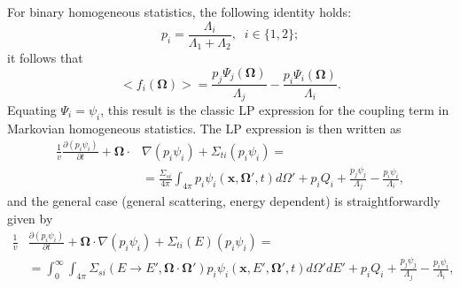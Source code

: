 \documentclass[12pt]{article}
\newcommand{\bl}{\big<}
\newcommand{\bg}{\big>}
\begin{document}
For binary homogeneous statistics, the following identity holds:
\begin{equation}\label{3.6}
p_i = \frac{\Lambda_i}{\Lambda_1+\Lambda_2},\;\; i\in\{1,2\};
\end{equation}
it follows that
\begin{equation}\label{3.7}
\bl f_i (\bm\Omega) \bg = \frac{p_j\Psi_j(\bm\Omega)}{\Lambda_j}
-\frac{p_i\Psi_i(\bm\Omega)}{\Lambda_i}.
\end{equation}
Equating $\Psi_i = \psi_i$, this result is the classic LP expression for the coupling term in Markovian homogeneous statistics.
The LP expression is then written as 
\begin{equation}%
\begin{split}
\frac{1}{v}\frac{\partial (p_i\psi_i)}{\partial t}+ \bm\Omega\cdot &\nabla(p_i\psi_i) + \Sigma_{ti}(p_i\psi_i) =
\\& =
 \frac{\Sigma_{si}}{4\pi}\int_{4\pi} p_i\psi_i(\bm x,\bm\Omega',t)d\Omega'+p_iQ_i +
 \frac{p_j\psi_j}{\Lambda_j} -  \frac{p_i\psi_i}{\Lambda_i},
\end{split}
\end{equation}
and the general case (general scattering, energy dependent) is straightforwardly given by
\begin{equation}\label{eq_averaged_closed}
\begin{split}
\frac{1}{v}&\frac{\partial (p_i\psi_i)}{\partial t}+ \bm\Omega\cdot \nabla(p_i\psi_i) + \Sigma_{ti}(E)(p_i\psi_i) =
\\& =
 \int_0^{\infty}\int_{4\pi} \Sigma_{si}(E\rightarrow E',\bm\Omega\cdot\bm\Omega')p_i\psi_i(\bm x,E',\bm\Omega',t)d\Omega'dE'+p_iQ_i +
 \frac{p_j\psi_j}{\Lambda_j} -  \frac{p_i\psi_i}{\Lambda_i},
\end{split}
\end{equation}
\end{document}
